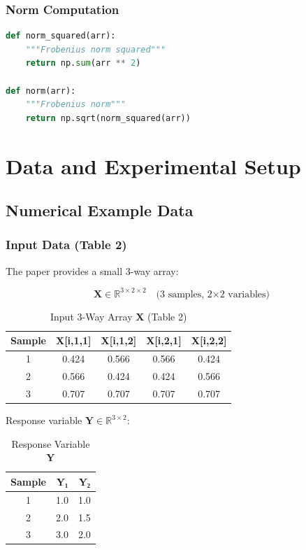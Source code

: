 \documentclass[12pt,a4paper]{article}
\begin{document}
\subsubsection{Norm Computation}
\begin{lstlisting}[language=Python]
def norm_squared(arr):
    """Frobenius norm squared"""
    return np.sum(arr ** 2)

def norm(arr):
    """Frobenius norm"""
    return np.sqrt(norm_squared(arr))
\end{lstlisting}

\newpage

\section{Data and Experimental Setup}

\subsection{Numerical Example Data}

\subsubsection{Input Data (Table 2)}

The paper provides a small 3-way array:

$$\mathbf{X} \in \mathbb{R}^{3 \times 2 \times 2} \quad \text{(3 samples, 2×2 variables)}$$

\begin{table}[H]
\centering
\caption{Input 3-Way Array $\mathbf{X}$ (Table 2)}
\begin{tabular}{ccccc}
\toprule
Sample & X[i,1,1] & X[i,1,2] & X[i,2,1] & X[i,2,2] \\
\midrule
1 & 0.424 & 0.566 & 0.566 & 0.424 \\
2 & 0.566 & 0.424 & 0.424 & 0.566 \\
3 & 0.707 & 0.707 & 0.707 & 0.707 \\
\bottomrule
\end{tabular}
\end{table}

Response variable $\mathbf{Y} \in \mathbb{R}^{3 \times 2}$:

\begin{table}[H]
\centering
\caption{Response Variable $\mathbf{Y}$}
\begin{tabular}{ccc}
\toprule
Sample & Y₁ & Y₂ \\
\midrule
1 & 1.0 & 1.0 \\
2 & 2.0 & 1.5 \\
3 & 3.0 & 2.0 \\
\bottomrule
\end{tabular}
\end{table}
\end{document}
